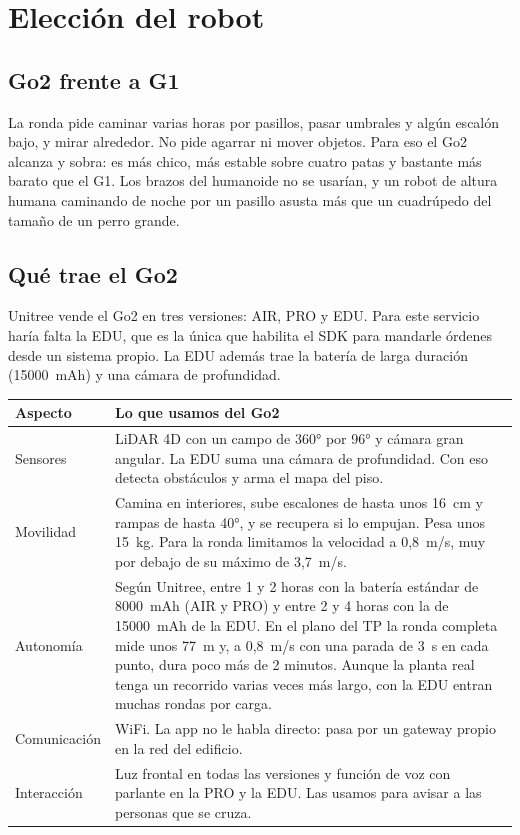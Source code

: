 \section{Elección del robot}
\label{sec:robot}

\subsection{Go2 frente a G1}

La ronda pide caminar varias horas por pasillos, pasar umbrales y algún escalón bajo, y mirar alrededor. No pide agarrar ni mover objetos. Para eso el Go2 alcanza y sobra: es más chico, más estable sobre cuatro patas y bastante más barato que el G1. Los brazos del humanoide no se usarían, y un robot de altura humana caminando de noche por un pasillo asusta más que un cuadrúpedo del tamaño de un perro grande.

\subsection{Qué trae el Go2}

Unitree vende el Go2 en tres versiones: AIR, PRO y EDU. Para este servicio haría falta la EDU, que es la única que habilita el SDK para mandarle órdenes desde un sistema propio. La EDU además trae la batería de larga duración (15000~mAh) y una cámara de profundidad.

\begin{table}[H]
\centering\small
\begin{tabularx}{\textwidth}{@{}l L@{}}
\toprule
\textbf{Aspecto} & \textbf{Lo que usamos del Go2} \\
\midrule
Sensores & LiDAR 4D con un campo de 360° por 96° y cámara gran angular. La EDU suma una cámara de profundidad. Con eso detecta obstáculos y arma el mapa del piso. \\
Movilidad & Camina en interiores, sube escalones de hasta unos 16~cm y rampas de hasta 40°, y se recupera si lo empujan. Pesa unos 15~kg. Para la ronda limitamos la velocidad a 0,8~m/s, muy por debajo de su máximo de 3,7~m/s. \\
Autonomía & Según Unitree, entre 1 y 2 horas con la batería estándar de 8000~mAh (AIR y PRO) y entre 2 y 4 horas con la de 15000~mAh de la EDU. En el plano del TP la ronda completa mide unos 77~m y, a 0,8~m/s con una parada de 3~s en cada punto, dura poco más de 2 minutos. Aunque la planta real tenga un recorrido varias veces más largo, con la EDU entran muchas rondas por carga. \\
Comunicación & WiFi. La app no le habla directo: pasa por un gateway propio en la red del edificio. \\
Interacción & Luz frontal en todas las versiones y función de voz con parlante en la PRO y la EDU. Las usamos para avisar a las personas que se cruza. \\
\bottomrule
\end{tabularx}
\end{table}


